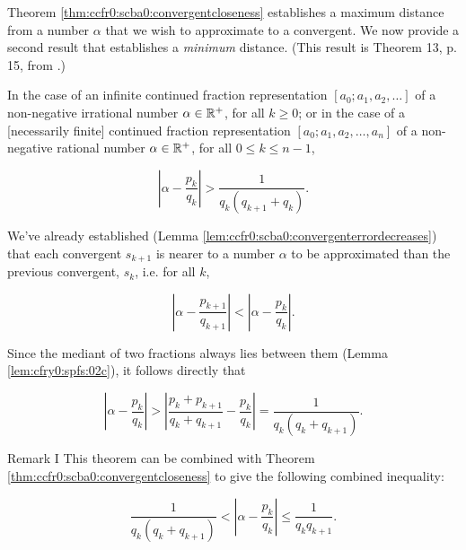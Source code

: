Theorem \ref{thm:ccfr0:scba0:convergentcloseness} establishes a
maximum distance from a number $\alpha$ that we wish to approximate
to a convergent.  We now provide a second result that establishes
a \emph{minimum} distance.  (This result is Theorem 13, p. 
15, from \cite{bibref:b:KhinchinClassic}.)

\begin{vworktheoremstatement}
\label{thm:ccfr0:scba0:convergentfarness}
In the case of an infinite continued fraction representation 
$[a_0; a_1, a_2, \ldots]$ of
a non-negative irrational number $\alpha \in {\mathbb{R}^+}$, 
for all $k \geq 0$; or in the case of a [necessarily finite]
continued fraction representation $[a_0; a_1, a_2, \ldots , a_n]$ 
of a non-negative rational number
$\alpha \in {\mathbb{R}^+}$, for all $0 \leq k \leq n-1$,

\begin{equation}
\label{eq:thm:ccfr0:scba0:convergentfarness:01}
\left| {\alpha - \frac{p_k}{q_k}} \right| > \frac{1}{q_k(q_{k+1}+q_k)} .
\end{equation}
\end{vworktheoremstatement}
\begin{vworktheoremproof}
We've already established (Lemma \ref{lem:ccfr0:scba0:convergenterrordecreases}) 
that each convergent $s_{k+1}$ is nearer to 
a number $\alpha$ to be approximated than the previous
convergent, $s_k$, i.e. for all $k$,

\begin{equation}
\label{eq:thm:ccfr0:scba0:convergentfarness:02}
\left| {\alpha - \frac{p_{k+1}}{q_{k+1}}} \right| <
\left| {\alpha - \frac{p_{k}}{q_{k}}} \right| .
\end{equation}

Since the mediant of two fractions always lies between
them (Lemma \ref{lem:cfry0:spfs:02c}), it
follows directly that 

\begin{equation}
\label{eq:thm:ccfr0:scba0:convergentfarness:03}
\left| {\alpha - \frac{p_{k}}{q_{k}}} \right| >
\left| {\frac{p_k + p_{k+1}}{q_k + q_{k+1}} - \frac{p_k}{q_k}} \right| =
\frac{1}{q_k ( q_k + q_{k+1})} .
\end{equation}
\end{vworktheoremproof}
\begin{vworktheoremparsection}{Remark I}
This theorem can be combined with Theorem \ref{thm:ccfr0:scba0:convergentcloseness}
to give the following combined inequality:

\begin{equation}
\label{eq:thm:ccfr0:scba0:convergentfarness:04}
\frac{1}{q_k ( q_k + q_{k+1})} < 
\left| {\alpha - \frac{p_{k}}{q_{k}}} \right| \leq
\frac{1}{q_k q_{k+1}} .
\end{equation}
\end{vworktheoremparsection}
\vworktheoremfooter{}

